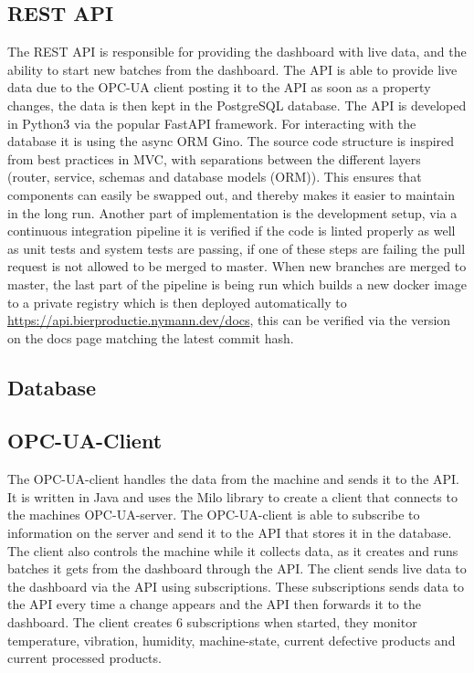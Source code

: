 \subsection{REST API}
The REST API is responsible for providing the dashboard with live data, and the
ability to start new batches from the dashboard. The API is able to provide
live data due to the OPC-UA client posting it to the API as soon as a property
changes, the data is then kept in the PostgreSQL database. The API is developed
in Python3 via the popular FastAPI framework. For interacting with the database
it is using the async ORM Gino. The source code structure is inspired from best
practices in MVC, with separations between the different layers (router,
service, schemas and database models (ORM)). This ensures that components can
easily be swapped out, and thereby makes it easier to maintain in the long run.
Another part of implementation is the development setup, via a continuous
integration pipeline it is verified if the code is linted properly as well as
unit tests and system tests are passing, if one of these steps are failing the
pull request is not allowed to be merged to master. When new branches are merged
to master, the last part of the pipeline is being run which builds a new docker
image to a private registry which is then deployed automatically to 
\url{https://api.bierproductie.nymann.dev/docs}, this can be verified via the
version on the docs page matching the latest commit hash.


\subsection{Database}

\subsection{OPC-UA-Client}
The OPC-UA-client handles the data from the machine and sends it to the API. It 
is written in Java and uses the Milo library to create a client that connects to 
the machines OPC-UA-server. The OPC-UA-client is able to subscribe to 
information on the server and send it to the API that stores it in the database.
The client also controls the machine while it collects data, as it creates and
runs batches it gets from the dashboard through the API. The client sends live
data to the dashboard via the API using subscriptions. These subscriptions sends
data to the API every time a change appears and the API then forwards it to the
dashboard. The client creates 6 subscriptions when started, they monitor
temperature, vibration, humidity, machine-state,  current defective products and
current processed products. \\

